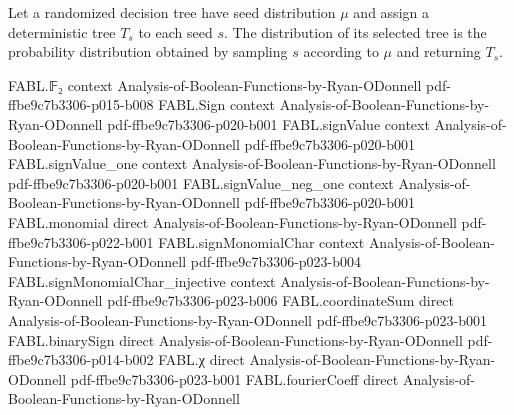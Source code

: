 \begin{definition}
\label{FABL.RandomizedDecisionTree.treePMF}
\leanok
{}
Let a randomized decision tree have seed distribution $\mu$ and assign a deterministic
tree $T_s$ to each seed $s$. The distribution of its selected tree is the probability
distribution obtained by sampling $s$ according to $\mu$ and returning $T_s$.
\end{definition}

\begin{theorem}
\label{FABL.RandomizedDecisionTree.treePMF_support_computes}
\leanok
{}
\proofstep
  {FABL.𝔽₂}
  {context}
  {Analysis-of-Boolean-Functions-by-Ryan-ODonnell}
  {pdf-ffbe9c7b3306-p015-b008}
\proofstep
  {FABL.Sign}
  {context}
  {Analysis-of-Boolean-Functions-by-Ryan-ODonnell}
  {pdf-ffbe9c7b3306-p020-b001}
\proofstep
  {FABL.signValue}
  {context}
  {Analysis-of-Boolean-Functions-by-Ryan-ODonnell}
  {pdf-ffbe9c7b3306-p020-b001}
\proofstep
  {FABL.signValue_one}
  {context}
  {Analysis-of-Boolean-Functions-by-Ryan-ODonnell}
  {pdf-ffbe9c7b3306-p020-b001}
\proofstep
  {FABL.signValue_neg_one}
  {context}
  {Analysis-of-Boolean-Functions-by-Ryan-ODonnell}
  {pdf-ffbe9c7b3306-p020-b001}
\proofstep
  {FABL.monomial}
  {direct}
  {Analysis-of-Boolean-Functions-by-Ryan-ODonnell}
  {pdf-ffbe9c7b3306-p022-b001}
\proofstep
  {FABL.signMonomialChar}
  {context}
  {Analysis-of-Boolean-Functions-by-Ryan-ODonnell}
  {pdf-ffbe9c7b3306-p023-b004}
\proofstep
  {FABL.signMonomialChar_injective}
  {context}
  {Analysis-of-Boolean-Functions-by-Ryan-ODonnell}
  {pdf-ffbe9c7b3306-p023-b006}
\proofstep
  {FABL.coordinateSum}
  {direct}
  {Analysis-of-Boolean-Functions-by-Ryan-ODonnell}
  {pdf-ffbe9c7b3306-p023-b001}
\proofstep
  {FABL.binarySign}
  {direct}
  {Analysis-of-Boolean-Functions-by-Ryan-ODonnell}
  {pdf-ffbe9c7b3306-p014-b002}
\proofstep
  {FABL.χ}
  {direct}
  {Analysis-of-Boolean-Functions-by-Ryan-ODonnell}
  {pdf-ffbe9c7b3306-p023-b001}
\proofstep
  {FABL.fourierCoeff}
  {direct}
  {Analysis-of-Boolean-Functions-by-Ryan-ODonnell}

\end{theorem}
